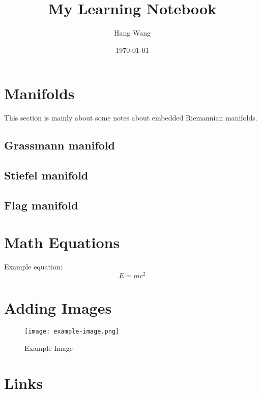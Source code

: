 \documentclass{article}
\title{My Learning Notebook}
\author{Hang Wang}
\date{\today}
\begin{document}
\maketitle

\section{Manifolds}
This section is mainly about some notes about embedded Riemannian manifolds.
\subsection{Grassmann manifold}

\subsection{Stiefel manifold}

\subsection{Flag manifold}

\section{Math Equations}
Example equation:
\[
E = mc^2
\]

\section{Adding Images}
\begin{figure}[h]
    \centering
    \texttt{[image: example-image.png]}
    \caption{Example Image}
\end{figure}

\section{Links}
\end{document}
